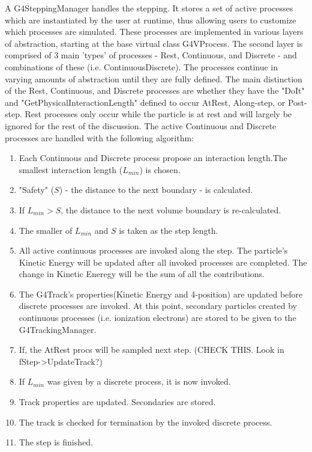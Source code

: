 \documentclass[12pt]{article}
\begin{document}
A G4SteppingManager handles the stepping. It stores a set of active processes which are instantiated by the user at runtime, thus allowing users to customize which processes are simulated. These processes are implemented in various layers of abstraction, starting at the base virtual class G4VProcess. The second layer is comprised of 3 main 'types' of processes - Rest, Continuous, and Discrete - and combinations of these (i.e. ContinuousDiscrete). The processes continue in varying amounts of abstraction until they are fully defined. The main distinction of the Rest, Continuous, and Discrete processes are whether they have the "DoIt" and "GetPhysicalInteractionLength" defined to occur AtRest, Along-step, or Post-step. Rest processes only occur while the particle is at rest and will largely be ignored for the rest of the discussion. The active Continuous and Discrete processes are handled with the following algorithm:
\begin{enumerate}
	\item Each Continuous and Discrete process propose an interaction length.The smallest interaction length ($L_{min}$) is chosen.
	\item "Safety" ($S$) - the distance to the next boundary - is calculated. %
	\item If $L_{min} > S$, the distance to the next volume boundary is re-calculated. 
	\item The smaller of $L_{min}$ and $S$ is taken as the step length. 
	\item All active continuous processes are invoked along the step. The particle's Kinetic Energy will be updated after all invoked processes are completed. The change in Kinetic Eneregy will be the sum of all the contributions.
	\item The G4Track's properties(Kinetic Energy and 4-position) are updated before discrete processes are invoked. At this point, secondary particles created by continuous processes (i.e. ionization electrons) are stored to be given to the G4TrackingManager. 
	\item If, the AtRest procs will be sampled next step. (CHECK THIS. Look in fStep->UpdateTrack?)
	\item If $L_{min}$ was given by a discrete process, it is now invoked.
	\item Track properties are updated. Secondaries are stored.
	\item The track is checked for termination by the invoked discrete process.
	\item The step is finished.
\end{enumerate}
\end{document}
